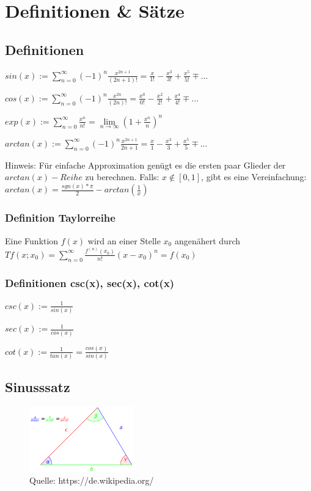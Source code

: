 
\section{Definitionen \& Sätze}
\subsection{Definitionen}

$sin(x) := \sum_{n=0}^{\infty} (-1)^n \frac{x^{2n+1}}{(2n+1)!} = \frac{x}{1!} - \frac{x^3}{3!} + \frac{x^5}{5!} \mp ...$

$cos(x) := \sum_{n=0}^{\infty} (-1)^n \frac{x^{2n}}{(2n)!} = \frac{x^0}{0!} - \frac{x^2}{2!} + \frac{x^4}{4!} \mp ...$

$exp(x) := \sum_{n=0}^{\infty} \frac{x^{n}}{n!} = \lim\limits_{n \rightarrow \infty}{(1 + \frac{x^{n}}{n})^n}$

$arctan(x) := \sum_{n=0}^{\infty} (-1)^n \frac{x^{2n+1}}{2n+1} = \frac{x}{1} - \frac{x^3}{3} + \frac{x^5}{5} \mp ...$

Hinweis: Für einfache Approximation genügt es die ersten paar Glieder der $arctan(x)-Reihe$ zu berechnen. \newline 
Falls: $x \notin [0,1]$, gibt es eine Vereinfachung:
$ arctan(x) = \frac{sgn(x) * \pi}{2} - arctan(\frac{1}{x}) $

\subsubsection{Definition Taylorreihe} Eine Funktion $f(x)$ wird an einer Stelle $x_0$ angenähert durch $Tf(x;x_0) = \sum_{n=0}^{\infty} \frac{f^{(n)}(x_0)}{n!}(x - x_0)^n = f(x_0)$ \\

\subsubsection{Definitionen csc(x), sec(x), cot(x)}
$csc(x) := \frac{1}{sin(x)}$

$sec(x) := \frac{1}{cos(x)}$

$cot(x) := \frac{1}{tan(x)} = \frac{cos(x)}{sin(x)}$

\subsection{Sinusssatz}
\begin{figure}[h!]
\centering
    \includegraphics[width=0.4\textwidth]{images/sinussatz.png}
    \caption{Quelle: https://de.wikipedia.org/}
    
\end{figure}
